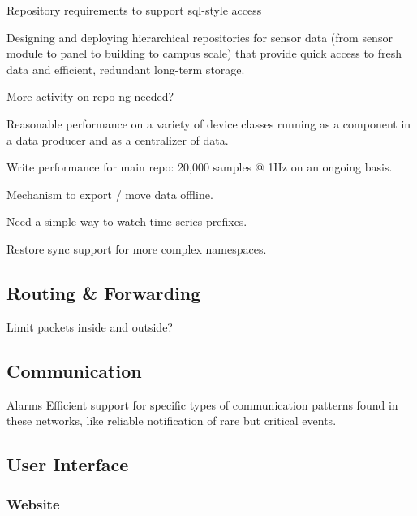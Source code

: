 Repository requirements to support sql-style access

Designing and deploying hierarchical repositories for sensor data (from sensor module to panel to building to campus scale) that provide quick access to fresh data and efficient, redundant long-term storage. 

More activity on repo-ng needed? 

Reasonable performance on a variety of device classes  running as a component in a data producer and as a centralizer of data. 

Write performance for main repo:  20,000 samples @ 1Hz on an ongoing basis.  

Mechanism to export / move data offline. 

Need a simple way to watch time-series prefixes. 

Restore sync support for more complex namespaces. 

\subsection{Routing \& Forwarding}

Limit packets inside and outside? 

\subsection{Communication}
Alarms
Efficient support for specific types of communication patterns found in these networks, like reliable notification of rare but critical events. 


\subsection{User Interface}
\subsubsection{Website}
